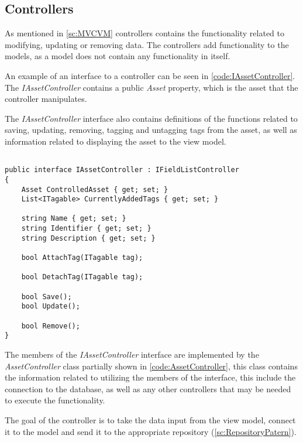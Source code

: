 \subsection{Controllers} \label{sc:Controllers}
As mentioned in \autoref{sc:MVCVM} controllers contains the functionality related to modifying, updating or removing data. The controllers add functionality to the models, as a model does not contain any functionality in itself. \par
An example of an interface to a controller can be seen in \autoref{code:IAssetController}. The \textit{IAssetController} contains a public \textit{Asset} property, which is the asset that the controller manipulates. \par
The \textit{IAssetController} interface also contains definitions of the functions related to saving, updating, removing, tagging and untagging tags from the asset, as well as information related to displaying the asset to the view model.

\begin{listing}[H]
\begin{verbatim}

public interface IAssetController : IFieldListController
{
    Asset ControlledAsset { get; set; }
    List<ITagable> CurrentlyAddedTags { get; set; }

    string Name { get; set; }
    string Identifier { get; set; }
    string Description { get; set; }

    bool AttachTag(ITagable tag);

    bool DetachTag(ITagable tag);

    bool Save();
    bool Update();

    bool Remove();
}

\end{verbatim}
\label{code:IAssetController}
\end{listing}
\par
The members of the \textit{IAssetController} interface are implemented by the \textit{AssetController} class partially shown in \autoref{code:AssetController}, this class contains the information related to utilizing the members of the interface, this include the connection to the database, as well as any other controllers that may be needed to execute the functionality. \par
The goal of the controller is to take the data input from the view model, connect it to the model and send it to the appropriate repository (\autoref{sc:RepositoryPatern}). \par

